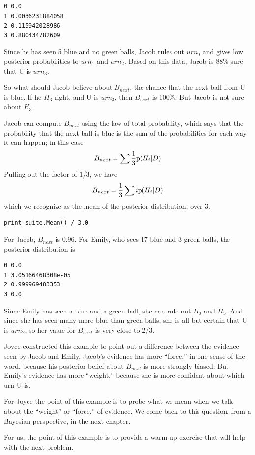 \documentclass[12pt]{book}
\begin{document}
\begin{verbatim}
0 0.0
1 0.0036231884058
2 0.115942028986
3 0.880434782609
\end{verbatim}

Since he has seen 5 blue and no green balls, Jacob rules out $urn_0$
and gives low posterior probabilities to $urn_1$ and $urn_2$.  Based
on this data, Jacob is 88\% sure that U is $urn_3$.

So what should Jacob believe about $B_{next}$, the chance that the
next ball from U is blue.  If he $H_3$ right, and U is $urn_3$,
then $B_{next}$ is 100\%.  But Jacob is not sure about $H_3$.

Jacob can compute $B_{next}$ using the law of total probability, which
says that the probability that the next ball is blue is the sum
of the probabilities for each way it can happen; in this case
%
\[ B_{next} = \sum \frac{1}{3} \mathrm{p}(H_i | D) \]
%
Pulling out the factor of $1/3$, we have
%
\[ B_{next} = \frac{1}{3} \sum i \mathrm{p}(H_i | D) \]
%
which we recognize as the mean of the posterior distribution, over 3.

\begin{verbatim}
print suite.Mean() / 3.0
\end{verbatim}

For Jacob, $B_{next}$ is 0.96.  For Emily, who sees 17 blue and 3 green
balls, the posterior distribution is 

\begin{verbatim}
0 0.0
1 3.05166468308e-05
2 0.999969483353
3 0.0
\end{verbatim}

Since Emily has seen a blue and a green ball, she can rule out $H_0$
and $H_3$.  And since she has seen many more blue than green balls,
she is all but certain that U is $urn_2$, so her value for $B_{next}$
is very close to 2/3.

Joyce constructed this example to point out a difference between the
evidence seen by Jacob and Emily.  Jacob's evidence has more
``force,'' in one sense of the word, because his posterior belief
about $B_{next}$ is more strongly biased.  But Emily's evidence has
more ``weight,'' because she is more confident about which urn U is.

For Joyce the point of this example is to probe what we mean
when we talk about the ``weight'' or ``force,'' of
evidence.  We come back to this question, from a Bayesian
perspective, in the next chapter.

For us, the point of this example is to provide a warm-up exercise
that will help with the next problem.
\end{document}
